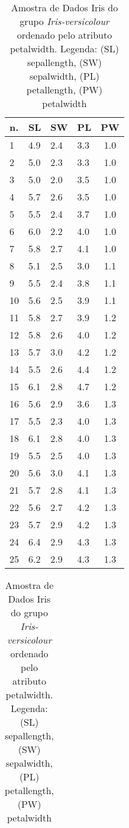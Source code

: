 \begin{table}[!ht]
\centering
\caption{Amostra de Dados Iris do grupo \textit{Iris-versicolour} ordenado pelo atributo petalwidth. Legenda: (SL) sepallength, (SW) sepalwidth, (PL) petallength, (PW) petalwidth}
\label{tab:analise:iris:cluster2:pw}
\begin{tabular}{|l|l|l|l|c|}
\hline 
 n. & SL & SW & PL & PW \\ \hline
1 & 4.9 & 2.4 & 3.3 & 1.0 \\ \hline
2 & 5.0 & 2.3 & 3.3 & 1.0 \\ \hline
3 & 5.0 & 2.0 & 3.5 & 1.0 \\ \hline
4 & 5.7 & 2.6 & 3.5 & 1.0 \\ \hline
5 & 5.5 & 2.4 & 3.7 & 1.0 \\ \hline
6 & 6.0 & 2.2 & 4.0 & 1.0 \\ \hline
7 & 5.8 & 2.7 & 4.1 & 1.0 \\ \hline
 \rowcolor[HTML]{EFEFEF} 
8 & 5.1 & 2.5 & 3.0 & 1.1 \\ \hline
 \rowcolor[HTML]{EFEFEF}  
9 & 5.5 & 2.4 & 3.8 & 1.1 \\ \hline
  \rowcolor[HTML]{EFEFEF} 
10 & 5.6 & 2.5 & 3.9 & 1.1 \\ \hline
 
\rowcolor[HTML]{EFEFEF} 
11 & 5.8 & 2.7 & 3.9 & 1.2 \\ \hline
 \rowcolor[HTML]{EFEFEF} 
12 & 5.8 & 2.6 & 4.0 & 1.2 \\ \hline
 \rowcolor[HTML]{EFEFEF} 
13 & 5.7 & 3.0 & 4.2 & 1.2 \\ \hline
 \rowcolor[HTML]{EFEFEF} 
14 & 5.5 & 2.6 & 4.4 & 1.2 \\ \hline
 \rowcolor[HTML]{EFEFEF} 
15 & 6.1 & 2.8 & 4.7 & 1.2 \\ \hline
 \rowcolor[HTML]{EFEFEF} 
16 & 5.6 & 2.9 & 3.6 & 1.3 \\ \hline
 \rowcolor[HTML]{EFEFEF} 
17 & 5.5 & 2.3 & 4.0 & 1.3 \\ \hline
 \rowcolor[HTML]{EFEFEF} 
18 & 6.1 & 2.8 & 4.0 & 1.3 \\ \hline
 \rowcolor[HTML]{EFEFEF} 
19 & 5.5 & 2.5 & 4.0 & 1.3 \\ \hline
 \rowcolor[HTML]{EFEFEF} 
20 & 5.6 & 3.0 & 4.1 & 1.3 \\ \hline
 \rowcolor[HTML]{EFEFEF} 
21 & 5.7 & 2.8 & 4.1 & 1.3 \\ \hline
 \rowcolor[HTML]{EFEFEF} 
22 & 5.6 & 2.7 & 4.2 & 1.3 \\ \hline
 \rowcolor[HTML]{EFEFEF} 
23 & 5.7 & 2.9 & 4.2 & 1.3 \\ \hline
 \rowcolor[HTML]{EFEFEF} 
24 & 6.4 & 2.9 & 4.3 & 1.3 \\ \hline
 \rowcolor[HTML]{EFEFEF} 
25 & 6.2 & 2.9 & 4.3 & 1.3 \\ \hline
  \end{tabular}
  \begin{tabular}{ |l|l|l|l|c| }
   

\end{tabular}
\end{table}
